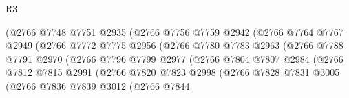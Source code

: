 \begin{lexlean}{R3}
\begin{coremodule}
                                  (@2766
                                    @7748
                                    @7751
                                    @2935
                                    (@2766
                                      @7756
                                      @7759
                                      @2942
                                      (@2766
                                        @7764
                                        @7767
                                        @2949
                                        (@2766
                                          @7772
                                          @7775
                                          @2956
                                          (@2766
                                            @7780
                                            @7783
                                            @2963
                                            (@2766
                                              @7788
                                              @7791
                                              @2970
                                              (@2766
                                                @7796
                                                @7799
                                                @2977
                                                (@2766
                                                  @7804
                                                  @7807
                                                  @2984
                                                  (@2766
                                                    @7812
                                                    @7815
                                                    @2991
                                                    (@2766
                                                      @7820
                                                      @7823
                                                      @2998
                                                      (@2766
                                                        @7828
                                                        @7831
                                                        @3005
                                                        (@2766
                                                          @7836
                                                          @7839
                                                          @3012
                                                          (@2766
                                                            @7844

\end{coremodule}
\end{lexlean}
